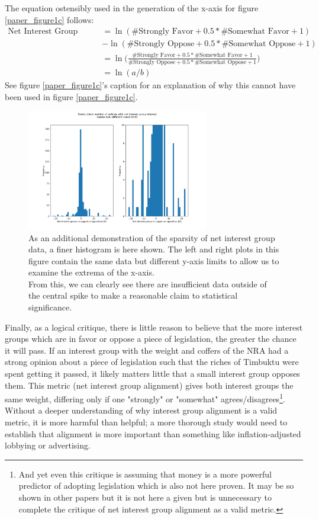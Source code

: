 \documentclass[]{article}
\begin{document}
The equation ostensibly used in the generation of the x-axis for figure \ref{paper_figure1c} follows:
\begin{align*}
	\text{Net Interest Group Alignment} &= \ln(\text{\# Strongly Favor} + 0.5 * \text{\# Somewhat Favor} + 1) \\&- \ln(\text{\# Strongly Oppose} + 0.5 * \text{\# Somewhat Oppose} + 1) \\&= \ln\Big(\frac{\text{\# Strongly Favor} + 0.5 * \text{\# Somewhat Favor} + 1}{\text{\# Strongly Oppose} + 0.5 * \text{\# Somewhat Oppose} + 1}\Big) \\&= \ln(a/b)
\end{align*}
See figure \ref{paper_figure1c}'s caption for an explanation of why this cannot have been used in figure \ref{paper_figure1c}.

\begin{figure}[H]
	\begin{center}
		\includegraphics[width=300px]{./figures/generated/interest-group-count-histogram.png}
	\end{center}	
	\caption{As an additional demonstration of the sparsity of net interest group data, a finer histogram is here shown. The left and right plots in this figure contain the same data but different y-axis limits to allow us to examine the extrema of the x-axis. \\From this, we can clearly see there are insufficient data outside of the central spike to make a reasonable claim to statistical significance.}
	\label{generated_figure1c_data_sparsity}
\end{figure}

Finally, as a logical critique, there is little reason to believe that the more interest groups which are in favor or oppose a piece of legislation, the greater the chance it will pass.
If an interest group with the weight and coffers of the NRA had a strong opinion about a piece of legislation such that the riches of Timbuktu were spent getting it passed, it likely matters little that a small interest group opposes them. 
This metric (net interest group alignment) gives both interest groups the same weight, differing only if one "strongly" or "somewhat" agrees/disagrees\footnote{And yet even this critique is assuming that money is a more powerful predictor of adopting legislation which is also not here proven. It may be so shown in other papers but it is not here a given but is unnecessary to complete the critique of net interest group alignment as a valid metric.}. Without a deeper understanding of why interest group alignment is a valid metric, it is more harmful than helpful; a more thorough study would need to establish that alignment is more important than something like inflation-adjusted lobbying or advertising.
\end{document}
